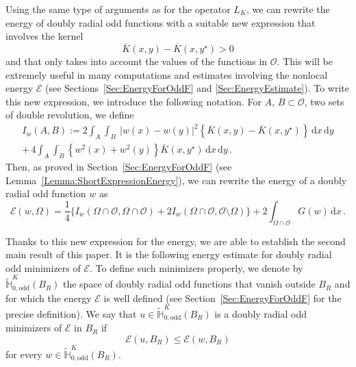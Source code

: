 \documentclass[12pt,reqno]{amsart}
\theoremstyle{definition}
\theoremstyle{remark}
\newcommand{\con}[1]{\mathbb{#1}}
\renewcommand{\H}{\con{H}}
\newcommand{\ecal}{\mathcal{E}}
\newcommand{\ocal}{\mathcal{O}}
\renewcommand{\d}{\,\mathrm{d}} %
\numberwithin{equation}{section}
\begin{document}
Using the same type of arguments as for the operator $L_K$, we can rewrite the energy of doubly radial odd functions with a suitable new expression that involves the kernel 
$$\overline{K}(x,y)-\overline{K}(x,y^\star)>0$$
and that only takes into account the values of the functions in $\ocal$. This will be extremely useful in many computations and estimates involving the nonlocal energy $\ecal$ (see Sections~\ref{Sec:EnergyForOddF} and \ref{Sec:EnergyEstimate}). To write this new expression, we introduce the following notation.  For $A$, $B\subset \ocal$, two sets of double revolution, we define
\begin{equation*}
\begin{split}
I_w(A,B) := 2\int_A  \int_B  \ |w(x)-w(y)|^2 \left\{ \overline{K}(x,y) - \overline{K}(x,y^\star) \right\} \d x \d y  \\
+\, 4 \int_A  \int_B  \left\{w^2(x)+w^2(y)\right\} \overline{K}(x,y^\star) \d x \d y\,.
\end{split}
\end{equation*}
Then, as proved in Section~\ref{Sec:EnergyForOddF} (see Lemma~\ref{Lemma:ShortExpressionEnergy}), we can rewrite the energy of a doubly radial odd function $w$ as
\begin{equation}
\label{Eq:ShortExpressionEnergyIntro}
\ecal(w, \Omega) = \frac{1}{4} \big \{I_w(\Omega\cap\ocal,\Omega\cap\ocal) +  2I_w(\Omega\cap\ocal,\ocal\setminus\Omega) \big \} + 2\int_{\Omega\cap \ocal} G(w) \d x \,.
\end{equation}



Thanks to this new expression for the energy, we are able to establish the second main result of this paper. It is the following energy estimate for doubly radial odd minimizers of $\ecal$. To define such minimizers properly, we denote by $\widetilde{\H}^K_{0, \mathrm{odd}}(B_R)$ the space of doubly radial odd functions that vanish outside $B_R$ and for which the energy $\ecal$ is well defined (see Section~\ref{Sec:EnergyForOddF} for the precise definition). We say that $u\in \widetilde{\H}^K_{0, \mathrm{odd}}(B_R)$ is a doubly radial odd minimizers of $\ecal$ in $B_R$ if
$$
\ecal(u,B_R) \leq \ecal (w,B_R)
$$
for every $w\in \widetilde{\H}^K_{0, \mathrm{odd}}(B_R)$. 
\end{document}

